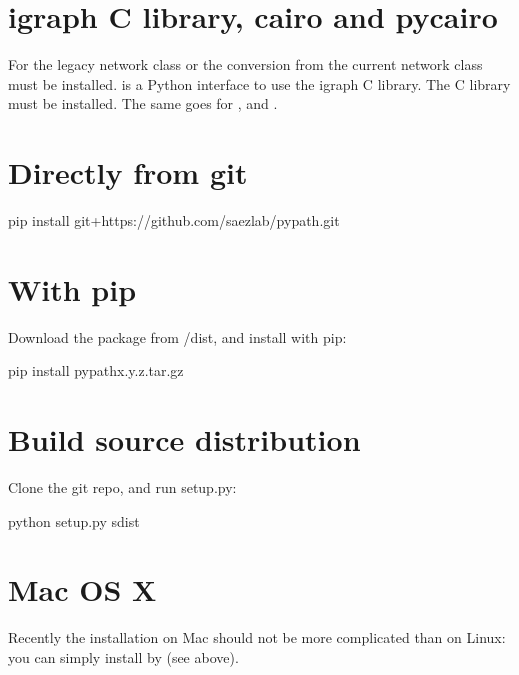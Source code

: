 \documentclass[letterpaper,10pt,english]{sphinxmanual}
\begin{document}
\section{igraph C library, cairo and pycairo}
\label{\detokenize{index:igraph-c-library-cairo-and-pycairo}}
For the legacy network class or the  conversion from the current
network class  must be installed.
 is a Python interface to use the igraph C library. The
C library must be installed. The same goes for ,  and
.


\section{Directly from git}
\label{\detokenize{index:directly-from-git}}
\begin{sphinxVerbatim}[commandchars=\\\{\}]
pip install git+https://github.com/saezlab/pypath.git
\end{sphinxVerbatim}


\section{With pip}
\label{\detokenize{index:with-pip}}
Download the package from /dist, and install with pip:

\begin{sphinxVerbatim}[commandchars=\\\{\}]
pip install pypath\PYGZhy{}x.y.z.tar.gz
\end{sphinxVerbatim}


\section{Build source distribution}
\label{\detokenize{index:build-source-distribution}}
Clone the git repo, and run setup.py:

\begin{sphinxVerbatim}[commandchars=\\\{\}]
python setup.py sdist
\end{sphinxVerbatim}


\section{Mac OS X}
\label{\detokenize{index:mac-os-x}}
Recently the installation on Mac should not be more complicated than on Linux:
you can simply install by  (see above).
\end{document}
